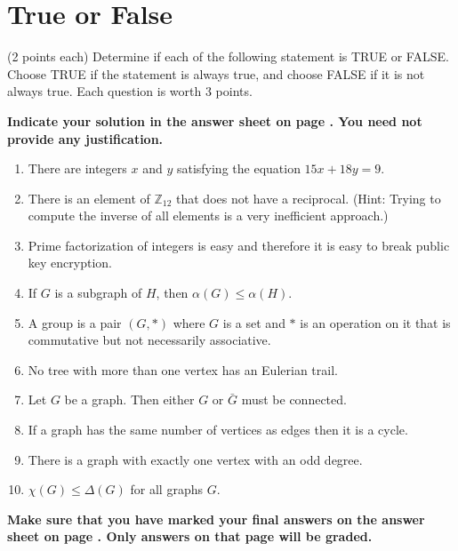 \documentclass[12pt]{article}
\begin{document}
\newpage
\section*{True or False}

(2 points each) Determine if each of the following statement is TRUE or FALSE.\\Choose TRUE if the statement is always true, and choose FALSE if it is not always true. Each question is worth 3 points.

\vspace{0.2cm}

\noindent
\textbf{Indicate your solution in the answer sheet on page \pageref{answersheet}.  You need not provide any justification.}


\begin{enumerate}
\item There are integers $x$ and $y$ satisfying the equation $15x+18y=9$.
\vspace{0.8cm}
\item There is an element of $\mathbb{Z}_{12}$ that does not have a reciprocal. (Hint: Trying to compute the inverse of all elements is a very inefficient approach.)
\vspace{0.8cm}
\item Prime factorization of integers is easy and therefore it is easy to break public key encryption.
\vspace{0.8cm}
\item If $G$ is a subgraph of $H$, then $\alpha(G)\leq\alpha(H)$.
\vspace{0.8cm}
\item A group is a pair $(G,*)$ where $G$ is a set and $*$ is an operation on it that is commutative but not necessarily associative.
\vspace{0.8cm}
\item No tree with more than one vertex has an Eulerian trail.
\vspace{0.8cm}
\item Let $G$ be a graph. Then either $G$ or $\bar{G}$ must be connected.
\vspace{0.8cm}
\item If a graph has the same number of vertices as edges then it is a cycle.
\vspace{0.8cm}
\item There is a graph with exactly one vertex with an odd degree.
\vspace{0.8cm}
\item $\chi(G)\leq\Delta(G)$ for all graphs $G$.
\end{enumerate}
\begin{center}
\textbf{Make sure that you have marked your final answers on the answer sheet on page \pageref{answersheet}. Only answers on that page will be graded.}
\end{center}
\newpage
\end{document}
